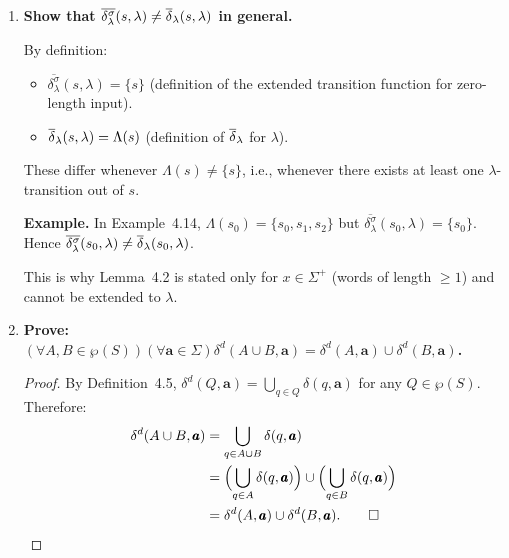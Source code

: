 \begin{enumerate}[{4.}1.]
\begin{proof}
\emph{Base:} $\DBAR^n(s_0,\lambda)=\{s_0\}=\{\deltabar{}(s_0,\lambda)\}$.

\emph{Step:} $\DBAR^n(s_0,x\pmb{a})
=\bigcup_{t\in\DBAR^n(s_0,x)}\delta^n(t,\pmb{a})
=\bigcup_{t\in\{\deltabar{}(s_0,x)\}}\{\delta(t,\pmb{a})\}
=\{\delta(\deltabar{}(s_0,x),\pmb{a})\}
=\{\deltabar{}(s_0,x\pmb{a})\}$.

Hence $x\in L(A^n)$ iff $\DBAR^n(s_0,x)\cap F\neq\emptyset$ iff
$\deltabar{}(s_0,x)\in F$ iff $x\in L(A)$. \qed
\end{proof}

\item \textbf{Show that $\overline{\delta^{\sigma}_\lambda}(s,\lambda)\neq\overline{\delta}_\lambda(s,\lambda)$ in general.}

By definition:
\begin{itemize}
  \item $\overline{\delta^{\sigma}_\lambda}(s,\lambda)=\{s\}$ (definition of
    the extended transition function for zero-length input).
  \item $\overline{\delta}_\lambda(s,\lambda)=\Lambda(s)$ (definition of $\overline{\delta}_\lambda$ for $\lambda$).
\end{itemize}

These differ whenever $\Lambda(s)\neq\{s\}$, i.e., whenever there exists at
least one $\lambda$-transition out of $s$.

\textbf{Example.}  In Example~4.14, $\Lambda(s_0)=\{s_0,s_1,s_2\}$ but
$\overline{\delta^{\sigma}_\lambda}(s_0,\lambda)=\{s_0\}$.  Hence
$\overline{\delta^{\sigma}_\lambda}(s_0,\lambda)\neq\overline{\delta}_\lambda(s_0,\lambda)$.

This is why Lemma~4.2 is stated only for $x\in\Sigma^+$ (words of length
$\ge 1$) and cannot be extended to $\lambda$.

\item \textbf{Prove: $(\forall A,B\in\wp(S))(\forall\pmb{a}\in\Sigma) 
\delta^d(A\cup B,\pmb{a})=\delta^d(A,\pmb{a})\cup\delta^d(B,\pmb{a})$.}

\begin{proof}
By Definition~4.5, $\delta^d(Q,\pmb{a})=\bigcup_{q\in Q}\delta(q,\pmb{a})$
for any $Q\in\wp(S)$.  Therefore:
\begin{align*}
  \delta^d(A\cup B,\pmb{a})
  &= \bigcup_{q\in A\cup B}\delta(q,\pmb{a}) \\
  &= \Bigl(\bigcup_{q\in A}\delta(q,\pmb{a})\Bigr)\cup\Bigl(\bigcup_{q\in B}\delta(q,\pmb{a})\Bigr) \\
  &= \delta^d(A,\pmb{a})\cup\delta^d(B,\pmb{a}). \qed
\end{align*}
\end{proof}


\end{enumerate}
